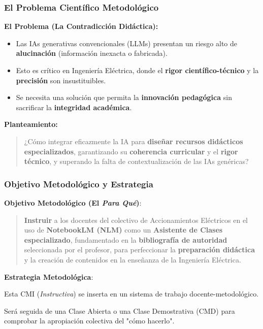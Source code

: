 \documentclass[aspectratio=43]{beamer}
\begin{document}
\begin{frame}
\frametitle{El Problema Científico Metodológico}

\textbf{El Problema (La Contradicción Didáctica):}
\begin{itemize}
    \item Las IAs generativas convencionales (LLMs) presentan un riesgo alto de \textbf{alucinación} (información inexacta o fabricada).
    \item Esto es crítico en Ingeniería Eléctrica, donde el \textbf{rigor científico-técnico} y la \textbf{precisión} son insustituibles.
    \item Se necesita una solución que permita la \textbf{innovación pedagógica} sin sacrificar la \textbf{integridad académica}.
\end{itemize}

\vfill

\textbf{Planteamiento:}
\begin{quote}
¿Cómo integrar eficazmente la IA para \textbf{diseñar recursos didácticos especializados}, garantizando su \textbf{coherencia curricular} y el \textbf{rigor técnico}, y superando la falta de contextualización de las IAs genéricas?
\end{quote}
\end{frame}

\begin{frame}
\frametitle{Objetivo Metodológico y Estrategia}

\textbf{Objetivo Metodológico (El \textit{Para Qué})}:
\begin{quote}
\textbf{Instruir} a los docentes del colectivo de Accionamientos Eléctricos en el uso de \textbf{NotebookLM (NLM)} como un \textbf{Asistente de Clases especializado}, fundamentado en la \textbf{bibliografía de autoridad} seleccionada por el profesor, para perfeccionar la \textbf{preparación didáctica} y la creación de contenidos en la enseñanza de la Ingeniería Eléctrica.
\end{quote}
\textbf{Estrategia Metodológica}:
\begin{itemize}
  {\small
    \item Esta CMI (\textit{Instructiva}) se inserta en un sistema de trabajo docente-metodológico.
    \item Será seguida de una Clase Abierta o una Clase Demostrativa (CMD) para comprobar la apropiación colectiva del "cómo hacerlo".
  }
  \end{itemize}
\end{frame}
\end{document}
